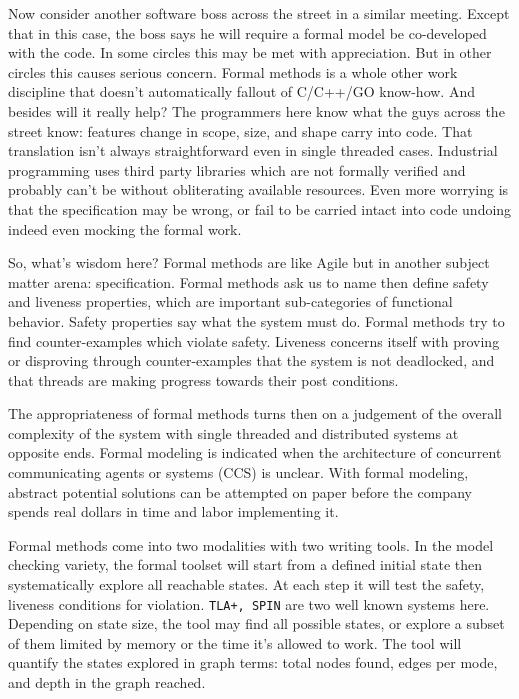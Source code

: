 \documentclass[twocolumn]{article}
\begin{document}
Now consider another software boss across the street in a similar meeting. Except that in this case, the boss says he will require a formal model be co-developed with the code. In some circles this may be met with appreciation. But in other circles this causes serious concern. Formal methods is a whole other work discipline that doesn't automatically fallout of C/C++/GO know-how. And besides will it really help? The programmers here know what the guys across the street know: features change in scope, size, and shape carry into code. That translation isn't always  straightforward even in single threaded cases. Industrial programming uses third party libraries which are not formally verified and probably can't be without obliterating available resources. Even more worrying is that the specification may be wrong, or fail to be carried intact into code undoing indeed even mocking the formal work.

So, what's wisdom here? Formal methods are like Agile but in another subject matter arena: specification. Formal methods ask us to name then define safety and liveness properties, which are important sub-categories of functional behavior. Safety properties say what the system must do. Formal methods try to find counter-examples which violate safety. Liveness concerns itself with proving or disproving through counter-examples that the system is not deadlocked, and that threads are making progress towards their post conditions. 

The appropriateness of formal methods turns then on a judgement of the overall complexity of the system with single threaded and distributed systems at opposite ends. Formal modeling is indicated when the architecture of concurrent communicating agents or systems (CCS) is unclear. With formal modeling, abstract potential solutions can be attempted on paper before the company spends real dollars in time and labor implementing it.

Formal methods come into two modalities with two writing tools. In the model checking variety, the formal toolset will start from a defined initial state then systematically explore all reachable states. At each step it will test the safety, liveness conditions for violation. \texttt{TLA+, SPIN} are two well known systems here. Depending on state size, the tool may find all possible states, or explore a subset of them limited by memory or the time it's allowed to work. The tool will quantify the states explored in graph terms: total nodes found, edges per mode, and depth in the graph reached.
\end{document}
